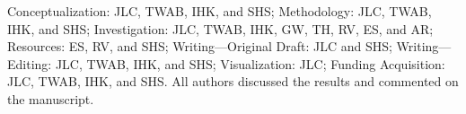 
Conceptualization: JLC, TWAB, IHK, and SHS; Methodology: JLC, TWAB, IHK, and
SHS; Investigation: JLC, TWAB, IHK, GW, TH, RV, ES, and AR; Resources: ES, RV,
and SHS; Writing—Original Draft: JLC and SHS; Writing—Editing: JLC, TWAB, IHK,
and SHS; Visualization: JLC; Funding Acquisition: JLC, TWAB, IHK, and SHS. All
authors discussed the results and commented on the manuscript.
